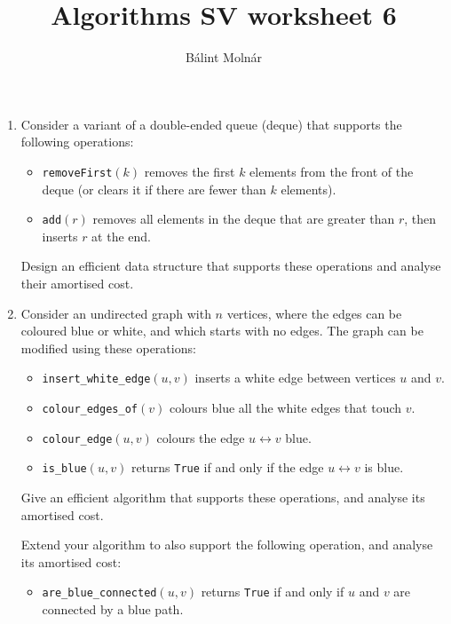 \documentclass{article}
\title{{Algorithms SV worksheet 6}}
\author{Bálint Molnár}
\begin{document}
\maketitle
 


\begin{enumerate}
\item 
Consider a variant of a double-ended queue (deque) that supports the following operations:

\begin{itemize}
    \item \texttt{removeFirst}$(k)$ removes the first $k$ elements from the front of the deque (or clears it if there are fewer than $k$ elements).
    \item \texttt{add}$(r)$ removes all elements in the deque that are greater than $r$, then inserts $r$ at the end.
\end{itemize}

Design an efficient data structure that supports these operations and analyse their amortised cost.

\item
    Consider an undirected graph with $n$ vertices, where the edges can be coloured blue or white, and which starts with no edges. The graph can be modified using these operations:

\begin{itemize}
    \item \texttt{insert\_white\_edge}$(u,v)$ inserts a white edge between vertices $u$ and $v$.
    \item \texttt{colour\_edges\_of}$(v)$ colours blue all the white edges that touch $v$.
    \item \texttt{colour\_edge}$(u,v)$ colours the edge $u \leftrightarrow v$ blue.
    \item \texttt{is\_blue}$(u,v)$ returns \texttt{True} if and only if the edge $u \leftrightarrow v$ is blue.
\end{itemize}

Give an efficient algorithm that supports these operations, and analyse its amortised cost.

Extend your algorithm to also support the following operation, and analyse its amortised cost:

\begin{itemize}
    \item \texttt{are\_blue\_connected}$(u,v)$ returns \texttt{True} if and only if $u$ and $v$ are connected by a blue path.
\end{itemize}


\end{enumerate}
\end{document}
